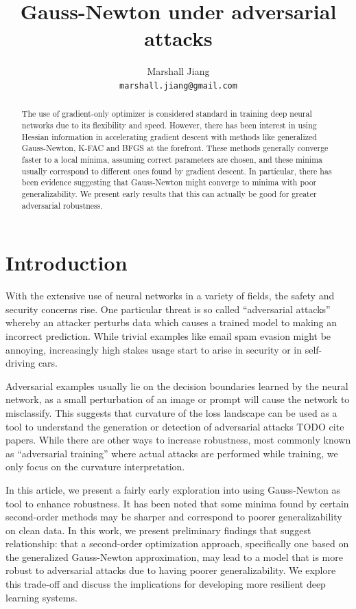 \documentclass{article}
\title{Gauss-Newton under adversarial attacks}
\author{%
    Marshall Jiang \\
    \texttt{marshall.jiang@gmail.com} \\
}
\begin{document}
    \maketitle


    \begin{abstract}
        The use of gradient-only optimizer is considered standard in training deep neural networks due to its flexibility and speed.
        However, there has been interest in using Hessian information in accelerating gradient descent with methods like
        generalized Gauss-Newton, K-FAC and BFGS at the forefront.
        These methods generally converge faster to a local minima, assuming correct parameters are chosen, and these minima usually correspond to different ones found by gradient descent.
        In particular, there has been evidence suggesting that Gauss-Newton might converge to minima with poor generalizability.
        We present early results that this can actually be good for greater adversarial robustness.
    \end{abstract}


    \section{Introduction}
    With the extensive use of neural networks in a variety of fields, the safety and security concerns rise.
    One particular threat is so called ``adversarial attacks'' whereby an attacker perturbs data which causes a trained model to making an incorrect prediction.
    While trivial examples like email spam evasion might be annoying, increasingly high stakes usage start to arise in security or in self-driving cars.

    Adversarial examples usually lie on the decision boundaries learned by the neural network, as a small perturbation of an image or prompt will cause the network to misclassify.
    This suggests that curvature of the loss landscape can be used as a tool to understand the generation or detection of adversarial attacks TODO cite papers.
    While there are other ways to increase robustness, most commonly known as ``adversarial training'' where actual attacks are performed while training, we only focus on the curvature interpretation.

    In this article, we present a fairly early exploration into using Gauss-Newton as tool to enhance robustness.
    It has been noted that some minima found by certain second-order methods may be sharper and correspond to poorer generalizability on clean data.
    In this work, we present preliminary findings that suggest relationship: that a second-order optimization approach, specifically one based on the generalized Gauss-Newton approximation, may lead to a model that is more robust to adversarial attacks due to having poorer generalizability.
    We explore this trade-off and discuss the implications for developing more resilient deep learning systems.
\end{document}
